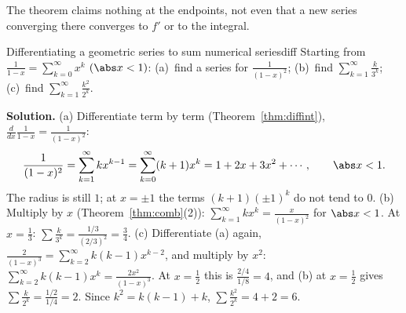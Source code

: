 \documentclass[11pt]{article}
\begin{document}
The theorem claims nothing at the endpoints, not even that a new series converging there converges to $f'$ or to the integral.

\begin{exmp}{Differentiating a geometric series to sum numerical series}{diff}
Starting from $\frac1{1-x}=\sum_{k=0}^\infty x^k$ $(\abs x<1)$: (a)~find a series for $\frac1{(1-x)^2}$; (b)~find $\sum_{k=1}^\infty\frac k{3^k}$; (c)~find $\sum_{k=1}^\infty\frac{k^2}{2^k}$.

\textbf{Solution.} (a) Differentiate term by term (Theorem~\ref{thm:diffint}), $\frac d{dx}\frac1{1-x}=\frac1{(1-x)^2}$:
\[
\frac1{(1-x)^2}=\sum_{k=1}^\infty kx^{k-1}=\sum_{k=0}^\infty(k+1)x^k=1+2x+3x^2+\cdots,\qquad\abs x<1 .
\]
The radius is still $1$; at $x=\pm1$ the terms $(k+1)(\pm1)^k$ do not tend to $0$. (b) Multiply by $x$ (Theorem~\ref{thm:comb}(2)): $\sum_{k=1}^\infty kx^k=\frac x{(1-x)^2}$ for $\abs x<1$. At $x=\frac13$: $\sum\frac k{3^k}=\frac{1/3}{(2/3)^2}=\frac34$. (c) Differentiate (a) again, $\frac2{(1-x)^3}=\sum_{k=2}^\infty k(k-1)x^{k-2}$, and multiply by $x^2$: $\sum_{k=2}^\infty k(k-1)x^k=\frac{2x^2}{(1-x)^3}$. At $x=\frac12$ this is $\frac{2/4}{1/8}=4$, and (b) at $x=\frac12$ gives $\sum\frac k{2^k}=\frac{1/2}{1/4}=2$. Since $k^2=k(k-1)+k$, $\sum\frac{k^2}{2^k}=4+2=6$.
\end{exmp}
\end{document}
